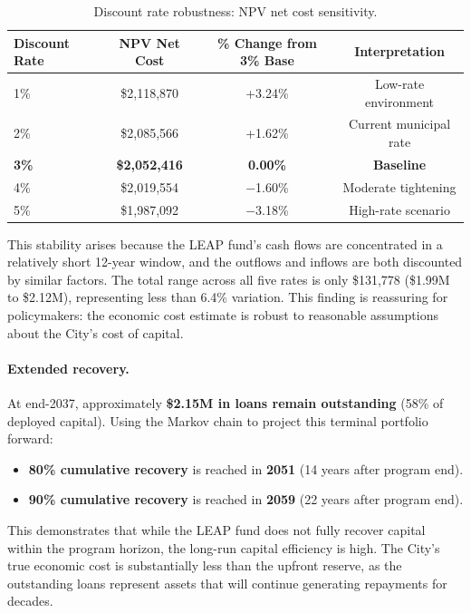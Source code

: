 \documentclass[11pt, letterpaper]{article}
\begin{document}
\begin{table}[H]
  \centering
  \caption{Discount rate robustness: NPV net cost sensitivity.}
  \label{tab:robustness}
  \begin{tabular}{@{}lccc@{}}
    \toprule
    \textbf{Discount Rate} & \textbf{NPV Net Cost} & \textbf{\% Change from 3\% Base} & \textbf{Interpretation} \\
    \midrule
    1\% & \$2{,}118{,}870 & +3.24\% & Low-rate environment \\
    2\% & \$2{,}085{,}566 & +1.62\% & Current municipal rate \\
    \textbf{3\%} & \textbf{\$2{,}052{,}416} & \textbf{0.00\%} & \textbf{Baseline} \\
    4\% & \$2{,}019{,}554 & $-$1.60\% & Moderate tightening \\
    5\% & \$1{,}987{,}092 & $-$3.18\% & High-rate scenario \\
    \bottomrule
  \end{tabular}
\end{table}

This stability arises because the LEAP fund's cash flows are concentrated in a relatively short 12-year window, and the outflows and inflows are both discounted by similar factors. The total range across all five rates is only \$131{,}778 (\$1.99M to \$2.12M), representing less than 6.4\% variation. This finding is reassuring for policymakers: the economic cost estimate is robust to reasonable assumptions about the City's cost of capital.

\paragraph{Extended recovery.} At end-2037, approximately \textbf{\$2.15M in loans remain outstanding} (58\% of deployed capital). Using the Markov chain to project this terminal portfolio forward:

\begin{itemize}[nosep]
  \item \textbf{80\% cumulative recovery} is reached in \textbf{2051} (14 years after program end).
  \item \textbf{90\% cumulative recovery} is reached in \textbf{2059} (22 years after program end).
\end{itemize}

This demonstrates that while the LEAP fund does not fully recover capital within the program horizon, the long-run capital efficiency is high. The City's true economic cost is substantially less than the upfront reserve, as the outstanding loans represent assets that will continue generating repayments for decades.
\end{document}
